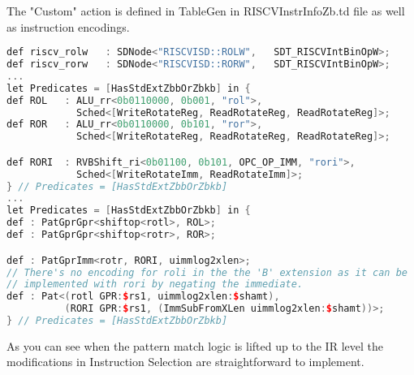 The "Custom" action is defined in TableGen in RISCVInstrInfoZb.td file as well as instruction encodings.

\begin{lstlisting}[language=C++, caption={ROR Encodings and Pattern}]
def riscv_rolw   : SDNode<"RISCVISD::ROLW",   SDT_RISCVIntBinOpW>;
def riscv_rorw   : SDNode<"RISCVISD::RORW",   SDT_RISCVIntBinOpW>;
...
let Predicates = [HasStdExtZbbOrZbkb] in {
def ROL   : ALU_rr<0b0110000, 0b001, "rol">,
            Sched<[WriteRotateReg, ReadRotateReg, ReadRotateReg]>;
def ROR   : ALU_rr<0b0110000, 0b101, "ror">,
            Sched<[WriteRotateReg, ReadRotateReg, ReadRotateReg]>;

def RORI  : RVBShift_ri<0b01100, 0b101, OPC_OP_IMM, "rori">,
            Sched<[WriteRotateImm, ReadRotateImm]>;
} // Predicates = [HasStdExtZbbOrZbkb]
...
let Predicates = [HasStdExtZbbOrZbkb] in {
def : PatGprGpr<shiftop<rotl>, ROL>;
def : PatGprGpr<shiftop<rotr>, ROR>;

def : PatGprImm<rotr, RORI, uimmlog2xlen>;
// There's no encoding for roli in the the 'B' extension as it can be
// implemented with rori by negating the immediate.
def : Pat<(rotl GPR:$rs1, uimmlog2xlen:$shamt),
          (RORI GPR:$rs1, (ImmSubFromXLen uimmlog2xlen:$shamt))>;
} // Predicates = [HasStdExtZbbOrZbkb]
\end{lstlisting}

As you can see when the pattern match logic is lifted up to the IR level the modifications in Instruction Selection are straightforward to implement. 



